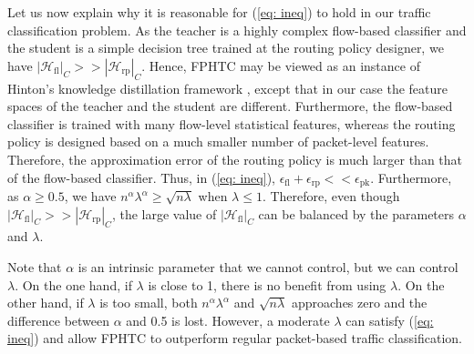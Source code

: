 Let us now explain why it is reasonable for (\ref{eq: ineq}) to hold in our traffic classification problem. As the teacher is a highly complex flow-based classifier and the student is a simple decision tree trained at the routing policy designer, we have $|\mathcal{H}_\text{fl}|_C>>|\mathcal{H}_\text{rp}|_C$. Hence, FPHTC may be viewed as an instance of Hinton's knowledge distillation framework \cite{Hinton15}, except that in our case the feature spaces of the teacher and the student are different. Furthermore, the flow-based classifier is trained with many flow-level statistical features, whereas the routing policy is designed based on a much smaller number of packet-level features. Therefore, the approximation error of the routing policy is much larger than that of the flow-based classifier. Thus, in (\ref{eq: ineq}), $\epsilon_\text{fl}+\epsilon_\text{rp}<<\epsilon_\text{pk}$. Furthermore, as $\alpha\geq 0.5$, we have $n^\alpha\lambda^\alpha\geq \sqrt{n\lambda}$ when $\lambda\leq 1$. Therefore, even though $|\mathcal{H}_\text{fl}|_C>>|\mathcal{H}_\text{rp}|_C$, the large value of $|\mathcal{H}_\text{fl}|_C$ can be balanced by the parameters $\alpha$ and $\lambda$.

Note that $\alpha$ is an intrinsic parameter that we cannot control, but we can control $\lambda$. On the one hand, if $\lambda$ is close to 1, there is no benefit from using $\lambda$. On the other hand, if $\lambda$ is too small, both $n^\alpha\lambda^\alpha$ and $\sqrt{n\lambda}$ approaches zero and the difference between $\alpha$ and 0.5 is lost. However, a moderate $\lambda$ can satisfy (\ref{eq: ineq}) and allow FPHTC to outperform regular packet-based traffic classification.
